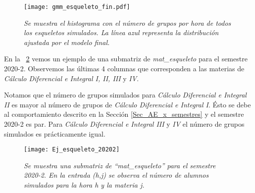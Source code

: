 \begin{figure}[h]
\centering
\texttt{[image: gmm\_esqueleto\_fin.pdf]} %
\caption[\textit{Histograma con  todos los datos de los esqueletos simulados}]{\textit{Se muestra el histograma con el número de grupos por hora de todos los esqueletos simulados. La línea azul representa la distribución ajustada por el modelo final.}}\label{hist_wait_esq_fin}
\end{figure}


En la \figurename{~\ref{esqueleto20202}} vemos un ejemplo de una submatriz de \textit{mat\_esqueleto} para el semestre 2020-2. Observemos las últimas 4 columnas que corresponden a las materias de \textit{Cálculo Diferencial e Integral I, II, III} y \textit{IV}.

Notamos que el número de grupos simulados para \textit{Cálculo Diferencial e Integral II} es mayor al número de grupos de \textit{Cálculo Diferencial e Integral I}. Ésto se debe al comportamiento descrito en la Sección \ref{Sec_AE_x_semestres} y el semestre 2020-2 es par. Para \textit{Cálculo Diferencial e Integral III} y \textit{IV} el número de grupos simulados es prácticamente igual.

\begin{figure}[H]
\centering
\texttt{[image: Ej\_esqueleto\_20202]} %
\caption[\textit{Esqueleto simulado para el semestre 2020-2}]{\textit{Se muestra una submatriz de ``mat\_esqueleto'' para el semestre 2020-2. En la entrada (h,j) se observa el número de alumnos simulados para la hora h y la materia j.}}\label{esqueleto20202}
\end{figure}


